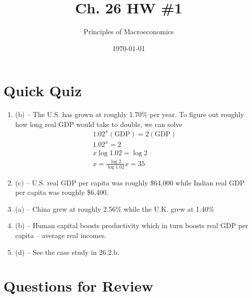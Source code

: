 \documentclass{article}
\title{Ch. 26 HW \#1}
\author{Principles of Macroeconomics}
\date{\today}
\begin{document}
\maketitle

\section*{Quick Quiz}

\begin{enumerate}

\item (b) -- The U.S. has grown at roughly 1.70\% per year. To figure out roughly how long real GDP would take to double, we can solve
	\begin{gather*}
	1.02^x (\text{GDP}) = 2(\text{GDP}) \\
	1.02^x = 2 \\
	x\log{1.02} = \log{2} \\
	x = \frac{\log{2}}{\log{1.02}}
	x = 35
	\end{gather*}

\item (c) -- U.S. real GDP per capita was roughly \$64,000 while Indian real GDP per capita was roughly \$6,400.

\item (a) -- China grew at roughly 2.56\% while the U.K. grew at 1.40\%

\item (b) -- Human capital boosts productivity which in turn boosts real GDP per capita -- average real incomes.

\item (d) -- See the case study in 26.2.b.

\end{enumerate}

\section*{Questions for Review}
\end{document}
